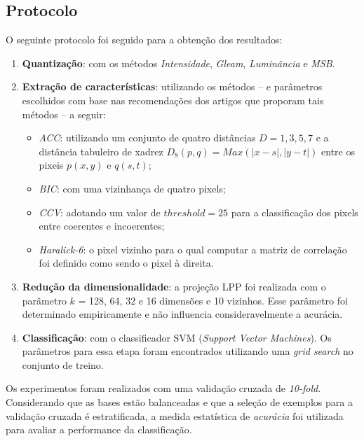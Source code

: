 \subsection{Protocolo}

O seguinte protocolo foi seguido para a obtenção dos resultados:

\begin{enumerate}
\item \textbf{Quantização}: com os métodos \emph{Intensidade}, \emph{Gleam}, \emph{Luminância} e \emph{MSB}.
\item \textbf{Extração de características}: utilizando os métodos -- e parâmetros escolhidos com base nas recomendações dos artigos que proporam tais métodos -- a seguir:
  \begin{itemize}
    \item \emph{ACC}: utilizando um conjunto de quatro distâncias $D = {1, 3, 5, 7}$ e a distância tabuleiro de xadrez $D_8(p,q) = Max(|x-s|, |y-t|)$ entre os pixeis $p(x,y)$ e $q(s,t)$;
    \item \emph{BIC}: com uma vizinhança de quatro pixels;
    \item \emph{CCV}: adotando um valor de $\mathit{threshold} = 25$ para a classificação dos pixels entre coerentes e incoerentes;
    \item \emph{Haralick-6}: o pixel vizinho para o qual computar a matriz de correlação foi definido como sendo o pixel à direita.
  \end{itemize}
\item \textbf{Redução da dimensionalidade}: a projeção LPP foi realizada com o parâmetro $k$ = 128, 64, 32 e 16 dimensões e 10 vizinhos. Esse parâmetro foi determinado empiricamente e não influencia consideravelmente a acurácia.
\item \textbf{Classificação}: com o classificador SVM (\textit{Support Vector Machines}). Os parâmetros para essa etapa foram encontrados utilizando uma \textit{grid search} no conjunto de treino.
\end{enumerate}

Os experimentos foram realizados com uma validação cruzada de \textit{10-fold}. Considerando que as bases estão balanceadas e que a seleção de exemplos para a validação cruzada é estratificada, a medida estatística de \textit{acurácia} foi utilizada para avaliar a performance da classificação.


